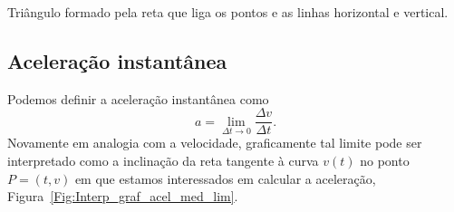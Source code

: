 \begin{marginfigure}[-4cm]
\caption{Triângulo formado pela reta que liga os pontos e as linhas horizontal e vertical.\label{Fig:Interp_graf_acel_med_b}}
\end{marginfigure}

\subsection{Aceleração instantânea}

Podemos definir a aceleração instantânea como
\begin{equation}
  a = \lim_{\Delta t \to 0} \frac{\Delta v}{\Delta t}.
\end{equation}
%
Novamente em analogia com a velocidade, graficamente tal limite pode ser interpretado como a inclinação da reta tangente à curva $v(t)$ no ponto $P = (t,v)$ em que estamos interessados em calcular a aceleração, Figura~\ref{Fig:Interp_graf_acel_med_lim}.

